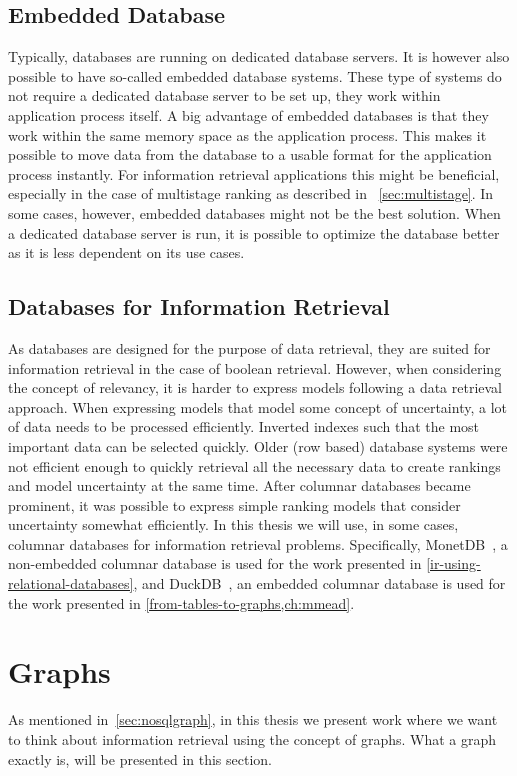 \subsection{Embedded Database}
Typically, databases are running on dedicated database servers. It is however also possible to have so-called embedded database systems. These type of systems do not require a dedicated database server to be set up, they work within application process itself. A big advantage of embedded databases is that they work within the same memory space as the application process. This makes it possible to move data from the database to a usable format for the application process instantly. For information retrieval applications this might be beneficial, especially in the case of multistage ranking as described in ~\cref{sec:multistage}. In some cases, however, embedded databases might not be the best solution. When a dedicated database server is run, it is possible to optimize the database better as it is less dependent on its use cases. 

\subsection{Databases for Information Retrieval}
As databases are designed for the purpose of data retrieval, they are suited for information retrieval in the case of boolean retrieval. However, when considering the concept of relevancy, it is harder to express models following a data retrieval approach. When expressing models that model some concept of uncertainty, a lot of data needs to be processed efficiently. Inverted indexes such that the most important data can be selected quickly. Older (row based) database systems were not efficient enough to quickly retrieval all the necessary data to create rankings and model uncertainty at the same time. After columnar databases became prominent, it was possible to express simple ranking models that consider uncertainty somewhat efficiently. In this thesis we will use, in some cases, columnar databases for information retrieval problems. Specifically, MonetDB~\cite{monet}, a non-embedded columnar database is used for the work presented in \cref{ir-using-relational-databases}, and DuckDB~\cite{duckdb}, an embedded columnar database is used for the work presented in \cref{from-tables-to-graphs,ch:mmead}.

\section{Graphs}
\label{sec:graphs}
As mentioned in~\cref{sec:nosqlgraph}, in this thesis we present work where we want to think about information retrieval using the concept of graphs. What a graph exactly is, will be presented in this section. 

